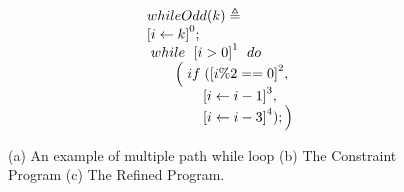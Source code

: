     { \footnotesize
    \begin{figure}
    \centering
    \begin{subfigure}{.3\textwidth}
      \[
        \begin{array}{l}
            \kw{whileOdd}(k) \triangleq \\
            \clabel{ \assign{i}{k} }^{0} ; \\
                \ewhile ~ \clabel{i > 0}^{1} ~ \edo ~ \\
                \qquad \Big(
                  \eif(\clabel{i \% 2 == 0 }^{2}, \\
                  \qquad \qquad \clabel{\assign{i}{i - 1}}^{3},\\
                  \qquad \qquad \clabel{\assign{i}{i - 3}}^{4});
                  \Big)
            \end{array}
        \]
    \end{subfigure}
    \begin{subfigure}{.3\textwidth}
        \begin{centering}
        \begin{tikzpicture}[scale=\textwidth/15cm,samples=200]
    \end{tikzpicture}
    \caption{}
    \end{centering}
    \end{subfigure}
            \begin{subfigure}{.3\textwidth}
                \begin{centering}
                \begin{tikzpicture}[scale=\textwidth/11cm,samples=200]
             \end{tikzpicture}
             \caption{}
                \end{centering}
                \end{subfigure}
    \caption{
    (a) An example of multiple path while loop 
    (b) The Constraint Program
    (c) The Refined Program.}
        \label{fig:whileOdd}
    \end{figure}
    }

